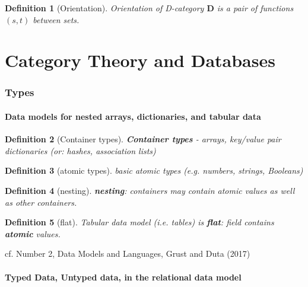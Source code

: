 \documentclass[10pt]{amsart}
\newtheorem{definition}{Definition}
\begin{document}
\begin{multicols*}{2}
\begin{definition}[Orientation]
	Orientation of D-category $\mathbf{D}$ is a pair of functions $(s,t)$ between sets.
	
\end{definition}


	

\part{Category Theory and Databases} 
	
\section{Types}

\subsection{Data models for nested arrays, dictionaries, and tabular data}

\begin{definition}[Container types]
	\textbf{Container types} - arrays, key/value pair dictionaries (or: hashes, association lists)
\end{definition}

\begin{definition}[atomic types]
	basic atomic types (e.g. numbers, strings, Booleans)
\end{definition}

\begin{definition}[nesting]
	\textbf{nesting}: containers may contain atomic values as well as other containers.
\end{definition}

\begin{definition}[flat]
	Tabular data model (i.e. tables) is \textbf{flat}: field contains \textbf{atomic} values.
\end{definition}
cf. Number 2, Data Models and Languages, Grust and Duta (2017) \cite{GrDu2017}


\subsection{Typed Data, Untyped data, in the relational data model}


\end{multicols*}
\end{document}
